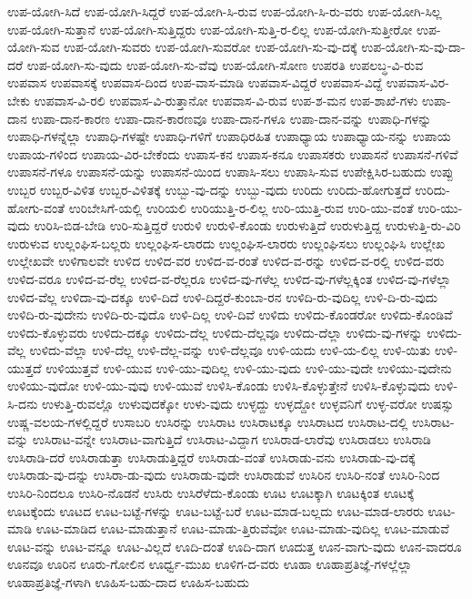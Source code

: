 {ಉಪ-ಯೋಗಿ-ಸಿದೆ
ಉಪ-ಯೋಗಿ-ಸಿದ್ದರೆ
ಉಪ-ಯೋಗಿ-ಸಿ-ರುವ
ಉಪ-ಯೋಗಿ-ಸಿ-ರು-ವರು
ಉಪ-ಯೋಗಿ-ಸಿಲ್ಲ
ಉಪ-ಯೋಗಿ-ಸುತ್ತಾನೆ
ಉಪ-ಯೋಗಿ-ಸುತ್ತಿದ್ದರು
ಉಪ-ಯೋಗಿ-ಸುತ್ತಿ-ರ-ಲಿಲ್ಲ
ಉಪ-ಯೋಗಿ-ಸುತ್ತೀರೋ
ಉಪ-ಯೋಗಿ-ಸುವ
ಉಪ-ಯೋಗಿ-ಸುವರು
ಉಪ-ಯೋಗಿ-ಸುವರೋ
ಉಪ-ಯೋಗಿ-ಸು-ವು-ದಕ್ಕೆ
ಉಪ-ಯೋಗಿ-ಸು-ವು-ದಾ-ದರೆ
ಉಪ-ಯೋಗಿ-ಸು-ವುದು
ಉಪ-ಯೋಗಿ-ಸು-ವೆವು
ಉಪ-ಯೋಗಿ-ಸೋಣ
ಉಪರತಿ
ಉಪಲಬ್ಧ-ವಿ-ರುವ
ಉಪವಾಸ
ಉಪವಾಸಕ್ಕೆ
ಉಪವಾಸ-ದಿಂದ
ಉಪ-ವಾಸ-ಮಾಡಿ
ಉಪವಾಸ-ವಿದ್ದರೆ
ಉಪವಾಸ-ವಿದ್ದೆ
ಉಪವಾಸ-ವಿರ-ಬೇಕು
ಉಪವಾಸ-ವಿ-ರಲಿ
ಉಪವಾಸ-ವಿ-ರುತ್ತಾನೋ
ಉಪವಾಸ-ವಿ-ರುವ
ಉಪ-ಶ-ಮನ
ಉಪ-ಶಾಖೆ-ಗಳು
ಉಪಾ-ದಾನ
ಉಪಾ-ದಾನ-ಕಾರಣ
ಉಪಾ-ದಾನ-ಕಾರಣವೂ
ಉಪಾ-ದಾನ-ಗಳೂ
ಉಪಾ-ದಾನ-ವನ್ನು
ಉಪಾಧಿ-ಗಳನ್ನು
ಉಪಾಧಿ-ಗಳನ್ನೆಲ್ಲಾ
ಉಪಾಧಿ-ಗಳಷ್ಟೇ
ಉಪಾಧಿ-ಗಳಿಗೆ
ಉಪಾಧಿರಹಿತ
ಉಪಾಧ್ಯಾಯ
ಉಪಾಧ್ಯಾಯ-ನನ್ನು
ಉಪಾಯ
ಉಪಾಯ-ಗಳಿಂದ
ಉಪಾಯ-ವಿರ-ಬೇಕೆಂದು
ಉಪಾಸ-ಕನ
ಉಪಾಸ-ಕನೂ
ಉಪಾಸಕರು
ಉಪಾಸನೆ
ಉಪಾಸನೆ-ಗಳಿವೆ
ಉಪಾಸನೆ-ಗಳೂ
ಉಪಾಸನೆ-ಯನ್ನು
ಉಪಾಸನೆ-ಯಿಂದ
ಉಪಾಸಿ-ಸಲು
ಉಪಾಸಿ-ಸುವ
ಉಪೇಕ್ಷಿಸಿರ-ಬಹುದು
ಉಪ್ಪು
ಉಬ್ಬರ
ಉಬ್ಬರ-ವಿಳಿತ
ಉಬ್ಬರ-ವಿಳಿತಕ್ಕೆ
ಉಬ್ಬು-ವು-ದನ್ನು
ಉಬ್ಬು-ವುದು
ಉರಿದು
ಉರಿದು-ಹೋಗುತ್ತದೆ
ಉರಿದು-ಹೋಗು-ವಂತೆ
ಉರಿಬೇಸಿಗೆ-ಯಲ್ಲಿ
ಉರಿಯಲಿ
ಉರಿಯುತ್ತಿ-ರ-ಲಿಲ್ಲ
ಉರಿ-ಯುತ್ತಿ-ರುವ
ಉರಿ-ಯು-ವಂತೆ
ಉರಿ-ಯು-ವುದು
ಉರಿಸಿ-ಬಿಡ-ಬೇಡಿ
ಉರಿ-ಸುತ್ತಿದ್ದರೆ
ಉರುಳಿ
ಉರುಳಿ-ಕೊಂಡು
ಉರುಳುತ್ತಿದೆ
ಉರುಳುತ್ತಿದ್ದ
ಉರುಳುತ್ತಿ-ರು-ವಿರಿ
ಉರುಳುವ
ಉಲ್ಲಂಘಿಸ-ಬಲ್ಲರು
ಉಲ್ಲಂಘಿಸ-ಲಾರದು
ಉಲ್ಲಂಘಿಸ-ಲಾರರು
ಉಲ್ಲಂಘಿಸಲು
ಉಲ್ಲಂಘಿಸಿ
ಉಲ್ಲೇಖ
ಉಲ್ಲೇಖವೇ
ಉಳಿಗಾಲವೇ
ಉಳಿದ
ಉಳಿದ-ವರ
ಉಳಿದ-ವ-ರಂತೆ
ಉಳಿದ-ವ-ರನ್ನು
ಉಳಿದ-ವ-ರಲ್ಲಿ
ಉಳಿದ-ವರು
ಉಳಿದ-ವರೂ
ಉಳಿದ-ವ-ರೆಲ್ಲ
ಉಳಿದ-ವ-ರೆಲ್ಲರೂ
ಉಳಿದ-ವು-ಗಳೆಲ್ಲ
ಉಳಿದ-ವು-ಗಳೆಲ್ಲಕ್ಕಿಂತ
ಉಳಿದ-ವು-ಗಳೆಲ್ಲಾ
ಉಳಿದ-ವೆಲ್ಲ
ಉಳಿದಾ-ವು-ದಕ್ಕೂ
ಉಳಿ-ದಿದೆ
ಉಳಿ-ದಿದ್ದರೆ-ಕುಂಬಾ-ರನ
ಉಳಿದಿ-ರು-ವುದಿಲ್ಲ
ಉಳಿ-ದಿ-ರು-ವುದು
ಉಳಿದಿ-ರು-ವುದೇನು
ಉಳಿದಿ-ರು-ವುದೊ
ಉಳಿ-ದಿಲ್ಲ
ಉಳಿ-ದಿವೆ
ಉಳಿದು
ಉಳಿದು-ಕೊಂಡರೋ
ಉಳಿದು-ಕೊಂಡಿವೆ
ಉಳಿದು-ಕೊಳ್ಳುವರು
ಉಳಿದು-ದಕ್ಕೂ
ಉಳಿದು-ದೆಲ್ಲ
ಉಳಿದು-ದೆಲ್ಲವೂ
ಉಳಿದು-ದೆಲ್ಲಾ
ಉಳಿದು-ವು-ಗಳನ್ನು
ಉಳಿದು-ವೆಲ್ಲ
ಉಳಿದು-ವೆಲ್ಲಾ
ಉಳಿ-ದೆಲ್ಲ
ಉಳಿ-ದೆಲ್ಲ-ವನ್ನು
ಉಳಿ-ದೆಲ್ಲವೂ
ಉಳಿ-ಯದು
ಉಳಿ-ಯ-ಲಿಲ್ಲ
ಉಳಿ-ಯಿತು
ಉಳಿ-ಯುತ್ತದೆ
ಉಳಿಯುತ್ತವೆ
ಉಳಿ-ಯುವ
ಉಳಿ-ಯು-ವುದಿಲ್ಲ
ಉಳಿ-ಯು-ವುದು
ಉಳಿ-ಯು-ವುದೇ
ಉಳಿಯು-ವುದೇನು
ಉಳಿಯು-ವುದೋ
ಉಳಿ-ಯು-ವುವು
ಉಳಿ-ಯುವೆ
ಉಳಿಸಿ-ಕೊಂಡು
ಉಳಿಸಿ-ಕೊಳ್ಳುತ್ತೇನೆ
ಉಳಿಸಿ-ಕೊಳ್ಳುವುದು
ಉಳಿ-ಸಿ-ದನು
ಉಳುತ್ತಿ-ರುವಲ್ಲೊ
ಉಳುವುದಕ್ಕೋ
ಉಳು-ವುದು
ಉಳ್ಳದ್ದು
ಉಳ್ಳದ್ದೋ
ಉಳ್ಳವನಿಗೆ
ಉಳ್ಳ-ವರೋ
ಉಷಸ್ಸು
ಉಷ್ಣ-ವಲಯ-ಗಳಲ್ಲಿದ್ದರೆ
ಉಸಾಬರಿ
ಉಸಿರನ್ನು
ಉಸಿರಾಟ
ಉಸಿರಾಟಕ್ಕೂ
ಉಸಿರಾಟದ
ಉಸಿರಾಟ-ದಲ್ಲಿ
ಉಸಿರಾಟ-ವನ್ನು
ಉಸಿರಾಟ-ವನ್ನೇ
ಉಸಿರಾಟ-ವಾಗುತ್ತಿದೆ
ಉಸಿರಾಟ-ವಿದ್ದಾಗ
ಉಸಿರಾಡ-ಲಾರೆವು
ಉಸಿರಾಡಲು
ಉಸಿರಾಡಿ
ಉಸಿರಾಡಿ-ದರೆ
ಉಸಿರಾಡುತ್ತಾ
ಉಸಿರಾಡುತ್ತಿದ್ದರೆ
ಉಸಿರಾಡು-ವಂತೆ
ಉಸಿರಾಡು-ವನು
ಉಸಿರಾಡು-ವು-ದಕ್ಕೆ
ಉಸಿರಾಡು-ವು-ದನ್ನು
ಉಸಿರಾ-ಡು-ವುದು
ಉಸಿರಾಡು-ವುದೇ
ಉಸಿರಾಡುವೆ
ಉಸಿರಿನ
ಉಸಿರಿ-ನಂತೆ
ಉಸಿರಿ-ನಿಂದ
ಉಸಿರಿ-ನಿಂದಲೂ
ಉಸಿರಿ-ನೊಡನೆ
ಉಸಿರು
ಉಸಿರೆಳೆದು-ಕೊಂಡು
ಊಟ
ಊಟಕ್ಕಾಗಿ
ಊಟಕ್ಕಿಂತ
ಊಟಕ್ಕೆ
ಊಟಕ್ಕೆಂದು
ಊಟದ
ಊಟ-ಬಟ್ಟೆ-ಗಳನ್ನು
ಊಟ-ಬಟ್ಟೆ-ಬರೆ
ಊಟ-ಮಾಡ-ಬಲ್ಲದು
ಊಟ-ಮಾಡ-ಲಾರರು
ಊಟ-ಮಾಡಿ
ಊಟ-ಮಾಡಿದ
ಊಟ-ಮಾಡುತ್ತಾನೆ
ಊಟ-ಮಾಡು-ತ್ತಿರುವೆವೋ
ಊಟ-ಮಾಡು-ವುದಿಲ್ಲ
ಊಟ-ಮಾಡುವೆ
ಊಟ-ವನ್ನು
ಊಟ-ವನ್ನೂ
ಊಟ-ವಿಲ್ಲದೆ
ಊದಿ-ದಂತೆ
ಊದಿ-ದಾಗ
ಊದುತ್ತ
ಊನ-ವಾಗು-ವುದು
ಊನ-ವಾದರೂ
ಊನವೂ
ಊರಿನ
ಊರು-ಗೋಲಿನ
ಊರ್ಧ್ವ-ಮುಖ
ಊಳಿಗ-ದ-ವರು
ಊಹಾ
ಊಹಾಪ್ರತಿಜ್ಞೆ-ಗಳಲ್ಲೆಲ್ಲಾ
ಊಹಾಪ್ರತಿಜ್ಞೆ-ಗಳಾಗಿ
ಊಹಿಸ-ಬಹು-ದಾದ
ಊಹಿಸ-ಬಹುದು
}
